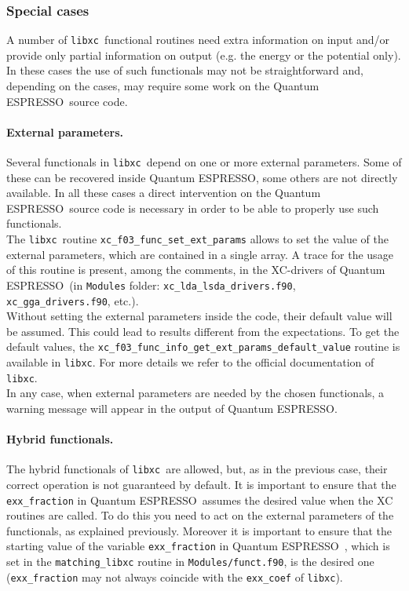\documentclass[12pt,a4paper]{article}
\def\qe{{\sc Quantum ESPRESSO}}
\def\libxc{\texttt{libxc}}
\begin{document}
\subsubsection{Special cases}
A number of \libxc\ functional routines need extra information on input and/or provide only partial information on output (e.g. the energy or the potential only). In these cases the use of such functionals may not be straightforward and, depending on the cases, may require some work on the \qe\ source code.
%
\paragraph{External parameters.}
Several functionals in \libxc\ depend on one or more external parameters. Some of these can be recovered inside \qe, some others are not directly available. In all these cases a direct intervention on the \qe\ source code is necessary in order to be able to properly use such functionals.\\
The \libxc\ routine \texttt{xc\_f03\_func\_set\_ext\_params} allows to set the value of the external parameters, which are contained in a single array. A trace for the usage of this routine is present, among the comments, in the XC-drivers of \qe\ (in \texttt{Modules} folder: \texttt{xc\_lda\_lsda\_drivers.f90}, \texttt{xc\_gga\_drivers.f90}, etc.).\\
Without setting the external parameters inside the code, their default value will be assumed. This could lead to results different from the expectations.
To get the default values, the \texttt{xc\_f03\-\_func\-\_info\_get\-\_ext\-\_params\-\_default\-\_value} routine is available in \libxc. For more details we refer to the official documentation of \libxc.\\
In any case, when external parameters are needed by the chosen functionals, a warning message will appear in the output of \qe.
%
\paragraph{Hybrid functionals.} The hybrid functionals of \libxc\ are allowed, but, as in the previous case, their correct operation is not guaranteed by default. It is important to ensure that the \texttt{exx\_fraction} in \qe\ assumes the desired value when the XC routines are called. To do this you need to act on the external parameters of the functionals, as explained previously. Moreover it is important to ensure that the starting value of the variable \texttt{exx\_fraction} in \qe\ , which is set in the \texttt{matching\_libxc} routine in \texttt{Modules/funct.f90}, is the desired one (\texttt{exx\_fraction} may not always coincide with the \texttt{exx\_coef} of \libxc).
%
\end{document}
